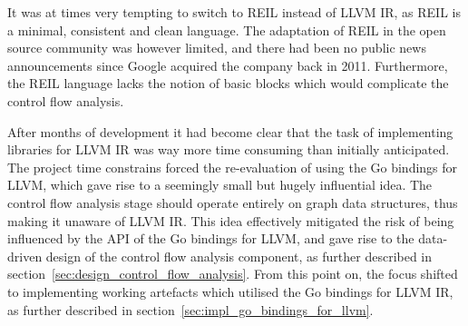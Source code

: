 It was at times very tempting to switch to REIL instead of LLVM IR, as REIL is a minimal, consistent and clean language. The adaptation of REIL in the open source community was however limited, and there had been no public news announcements since Google acquired the company back in 2011. Furthermore, the REIL language lacks the notion of basic blocks which would complicate the control flow analysis.

After months of development it had become clear that the task of implementing libraries for LLVM IR was way more time consuming than initially anticipated. The project time constrains forced the re-evaluation of using the Go bindings for LLVM, which gave rise to a seemingly small but hugely influential idea. The control flow analysis stage should operate entirely on graph data structures, thus making it unaware of LLVM IR. This idea effectively mitigated the risk of being influenced by the API of the Go bindings for LLVM, and gave rise to the data-driven design of the control flow analysis component, as further described in section~\ref{sec:design_control_flow_analysis}. From this point on, the focus shifted to implementing working artefacts which utilised the Go bindings for LLVM IR, as further described in section~\ref{sec:impl_go_bindings_for_llvm}.
